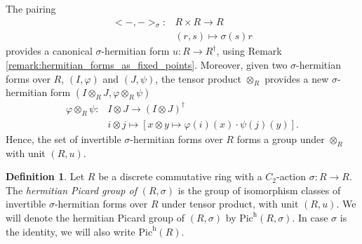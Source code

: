 \documentclass{article}
\theoremstyle{definition}
\newtheorem{definition}[equation]{Definition}
\begin{document}
The pairing 
\begin{align*}
    <-,->_\sigma: & R\times  R\rightarrow R\\
    & (r,s)\mapsto \sigma(s)r
\end{align*} 
provides a canonical $\sigma$-hermitian form $u:R\rightarrow R^\dagger$, using Remark \ref{remark:hermitian_forms_as_fixed_points}. Moreover, given two $\sigma$-hermitian forms over $R$, $(I,\varphi)$ and $(J,\psi)$, the tensor product $\otimes_R$ provides a new $\sigma$-hermitian form $(I\otimes_R J, \varphi \otimes_R \psi)$
\begin{align*}
    \varphi\otimes_R \psi: & I\otimes J \rightarrow (I\otimes J)^\dagger\\
    & i\otimes j\mapsto \left[x\otimes y \mapsto \varphi(i)(x)\cdot \psi(j)(y)\right].
\end{align*}  
Hence, the set of invertible $\sigma$-hermitian forms over $R$ forms a group under $\otimes_R$ with unit $(R,u)$.

\begin{definition}
    \label{definition:hermitian_picard_group}
    Let $R$ be a discrete commutative ring with a $C_2$-action $\sigma: R \rightarrow R$. The \emph{hermitian Picard group of} $(R,\sigma)$ is the group of isomorphism classes of invertible $\sigma$-hermitian forms over $R$ under tensor product, with unit $(R,u)$. We will denote the hermitian Picard group of $(R,\sigma)$ by $\text{Pic}^\text{h}(R,\sigma)$. In case $\sigma$ is the identity, we will also write $\text{Pic}^\text{h}(R)$.
\end{definition}
\end{document}
